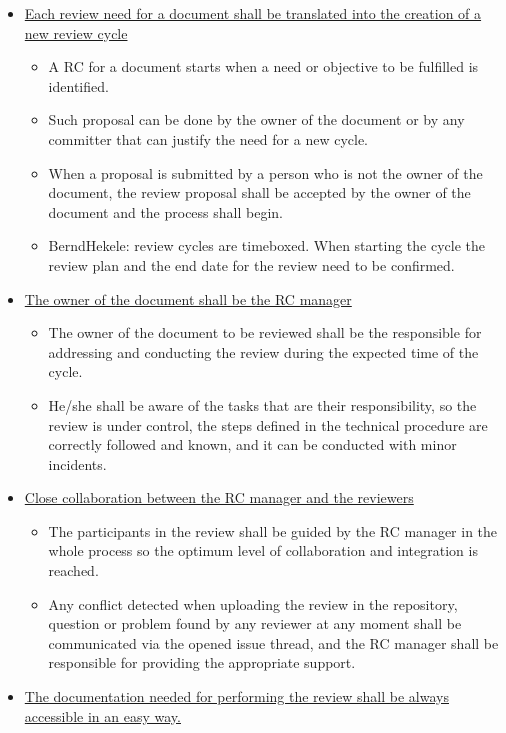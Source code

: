 \documentclass{template/openetcs_article}
\begin{document}
\begin{itemize}
\item \underline{Each review need for a document shall be translated into the creation of a new review cycle}
\begin{itemize}
\item A RC for a document starts when a need or objective to be fulfilled is identified.
\item Such proposal can be done by the owner of the document or by any committer that can justify the need for a new cycle. 
\item When a proposal is submitted by a person who is not the owner of the document, the review proposal shall be accepted by the owner of the document and the process shall begin.
\item BerndHekele: review cycles are timeboxed. When starting the cycle the review plan and the end date for the review need to be confirmed.
 
\end{itemize}
\item \underline{The owner of the document shall be the RC manager}
\begin{itemize}
\item The owner of the document to be reviewed shall be the responsible for addressing and conducting the review during the expected time of the cycle. 
\item He/she shall be aware of the tasks that are their responsibility, so the review is under control, the steps defined in the technical procedure are correctly followed and known, and it can be conducted with minor incidents. 
\end{itemize}

\item \underline{Close collaboration between the RC manager and the reviewers}
\begin{itemize}
\item The participants in the review shall be guided by the RC manager in the whole process so the optimum level of collaboration and integration is reached. 
\item Any conflict detected when uploading the review in the repository, question or problem found by any reviewer at any moment shall be communicated via the opened issue thread, and the RC manager shall be responsible for providing the appropriate support.
\end{itemize}

\item \underline{The documentation needed for performing the review shall be always accessible in an easy way.}


\end{itemize}
\end{document}
